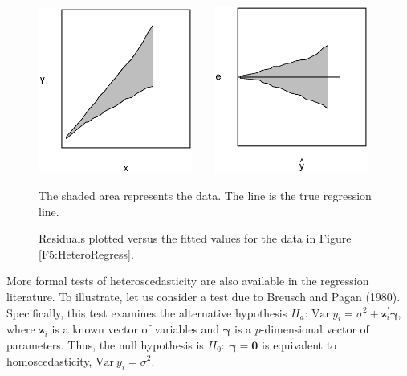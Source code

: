\begin{figure}[htp]
    \includegraphics[width=0.45\textwidth]{Chapter5/F5HeteroRegress.eps}
    $~~~~~~$
    \includegraphics[width=0.45\textwidth]{Chapter5/F5HeteroResid.eps}    \hfill
      \parbox[t]{2.5in}{\caption{\label{F5:HeteroRegress} \small  The shaded area
represents the data. The line is the true regression line.}} \hfill
        \parbox[t]{2.5in}{ \caption{\label{F5:HeteroResid} \small  Residuals plotted
versus the fitted values for the data in Figure
\ref{F5:HeteroRegress}.}}
\end{figure}

More formal tests of heteroscedasticity are also available in the
regression literature. To illustrate, let us consider a test due to
Breusch and Pagan (1980). Specifically, this test examines the
alternative hypothesis $H_a$: $\mathrm{Var~} y_i = \sigma^2 +
\mathbf{z}_i^{\prime} \boldsymbol \gamma $, where $\mathbf{z}_i$ is
a known vector of variables and $\boldsymbol \gamma$ is a
$p$-dimensional vector of parameters. Thus, the null hypothesis is
$H_0:~ \boldsymbol \gamma = \mathbf{0}$ is equivalent to
homoscedasticity,  $\mathrm{Var~} y_i = \sigma^2.$

\bigskip

\boxedjed


